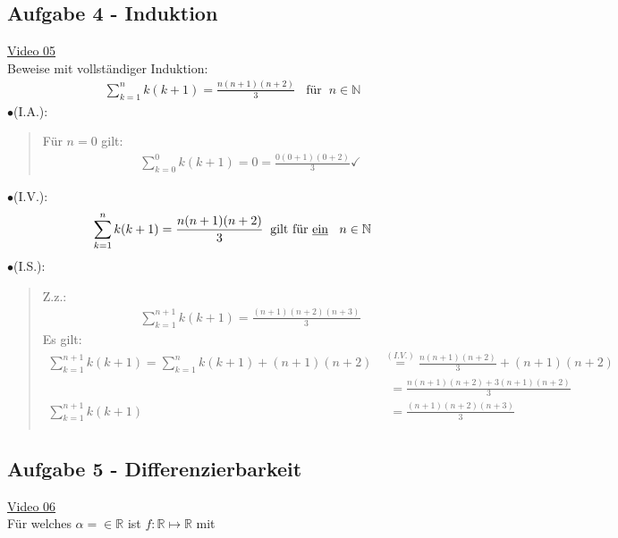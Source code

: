 \subsection{Aufgabe 4 - Induktion}
\href{https://youtu.be/nJx5VsSVHaQ?t=5}{Video 05}\\
Beweise mit vollständiger Induktion:\\
\begin{align*}
\sum\limits_{k=1}^{n}k(k+1)=\frac{n(n+1)(n+2)}{3}\;\;\text{ für}\;\;n\in\mathbb{N}
\end{align*}
$ \bullet $\;\;(I.A.):\\
\begin{quote}
	Für $ n=0 $ gilt:\\
	\begin{align*}
	\sum\limits_{k=0}^{0}k(k+1)=0=\frac{0(0+1)(0+2)}{3}\checkmark
	\end{align*}
\end{quote}
$ \bullet $\;\;(I.V.):\\
\begin{align*}
\sum\limits_{k=1}^{n}k(k+1)=\frac{n(n+1)(n+2)}{3}\;\;\text{gilt für \underline{ein} }\;\;n\in\mathbb{N}
\end{align*}
$ \bullet $\;\;(I.S.):\\
\begin{quote}
	Z.z.:
	\begin{align*}
	\sum\limits_{k=1}^{n+1}k(k+1)=\frac{(n+1)(n+2)(n+3)}{3}
	\end{align*}
	Es gilt:\\
	\begin{align*}
	\sum\limits_{k=1}^{n+1}k(k+1)=	\sum\limits_{k=1}^{n}k(k+1)+(n+1)(n+2)&\overset{(I.V.)}{=}\frac{n(n+1)(n+2)}{3}+(n+1)(n+2)\\
	&\;\;=\frac{n(n+1)(n+2)+3(n+1)(n+2)}{3}\\\sum\limits_{k=1}^{n+1}k(k+1)&\;\;=\frac{(n+1)(n+2)(n+3)}{3}\boxed{}\\
	\end{align*}
\end{quote}

\subsection{Aufgabe 5 - Differenzierbarkeit}
\href{https://youtu.be/8EBDpt2f5S0}{Video 06}\\
Für welches $ \alpha=\in\mathbb{R} $ ist $ f:\mathbb{R}\mapsto \mathbb{R}$ mit\\

